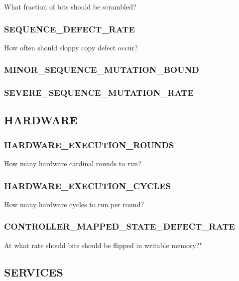 
What fraction of bits should be scrambled?

\subsubsection{SEQUENCE\_DEFECT\_RATE}


How often should sloppy copy defect occur?

\subsubsection{MINOR\_SEQUENCE\_MUTATION\_BOUND}


\subsubsection{SEVERE\_SEQUENCE\_MUTATION\_RATE}


\subsection{HARDWARE}

\subsubsection{HARDWARE\_EXECUTION\_ROUNDS}


How many hardware cardinal rounds to run?

\subsubsection{HARDWARE\_EXECUTION\_CYCLES}


How many hardware cycles to run per round?

\subsubsection{CONTROLLER\_MAPPED\_STATE\_DEFECT\_RATE}


At what rate should bits should be flipped in writable memory?"

\subsection{SERVICES}

